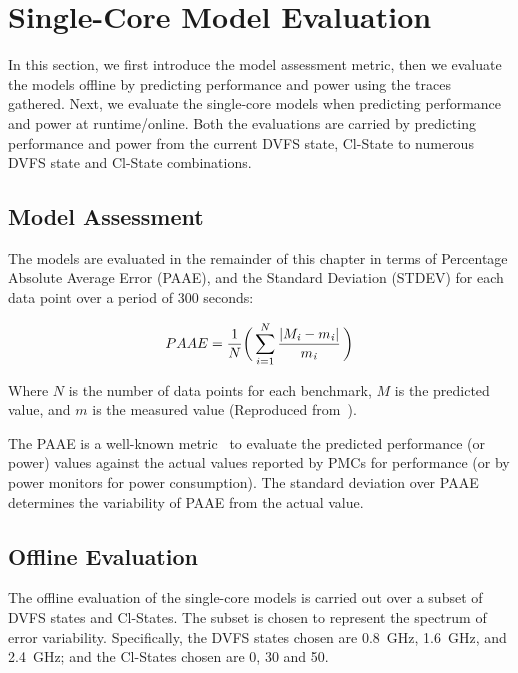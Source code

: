 


\section{Single-Core Model Evaluation} 

In this section, we first introduce the model assessment metric, then we evaluate the
models offline by predicting performance and power using the traces gathered.  Next, we
evaluate the single-core models when predicting performance and power at runtime/online.
Both the evaluations are carried by predicting performance and power from the current DVFS
state, Cl-State to numerous DVFS state and Cl-State combinations. 

\subsection{Model Assessment}
\label{subsubsec: metric}

The models are evaluated in the remainder of this chapter in terms of Percentage Absolute
Average Error (PAAE), and the Standard Deviation (STDEV) for each data point over a period
of 300 seconds:

\begin{equation}
    \label{eq: PAAE}
PAAE = 
\frac{1}{N}\biggl(\,
  \sum_{i=1}^{N}
  \frac{\abs{M_{\mathit{i}} - m_{\mathit{i}}}}
        {m_{\mathit{i}}}
\,\biggr)
\end{equation} 

Where $N$ is the number of data points for each benchmark, $M$ is the predicted value, and
$m$ is the measured value (Reproduced from~\citep{Pusukuri-PAAE}).

The PAAE is a well-known metric~\citep{Su:2014:POP:2742155.2742200, 10.1109/TC.2012.97,
Pusukuri-PAAE, Bircher-PAAE} to evaluate the predicted
performance (or power) values against the actual values reported by PMCs for performance
(or by power monitors for power consumption). The standard deviation over PAAE determines
the variability of PAAE from the actual value.

\subsection{Offline Evaluation} 
\label{subsubsection: offlinesinglecore evaluation}

The offline evaluation of the single-core models is carried out over a subset of DVFS
states and Cl-States. The subset is chosen to represent the spectrum of error variability.
Specifically, the DVFS states chosen are \SI{0.8}{\giga\hertz}, \SI{1.6}{\giga\hertz}, and
\SI{2.4}{\giga\hertz}; and the Cl-States chosen are 0, 30 and 50.

